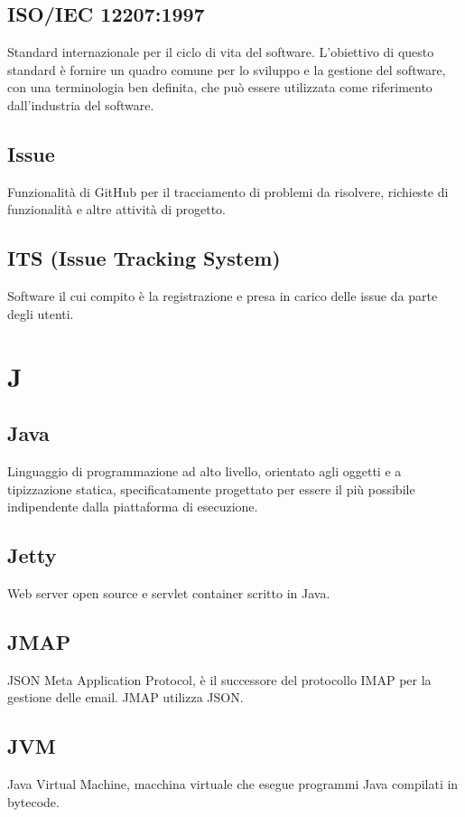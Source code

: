 \documentclass[12pt]{article}
\begin{document}
		\subsection{ISO/IEC 12207:1997}
		Standard internazionale per il ciclo di vita del software. L'obiettivo di questo standard è fornire un quadro comune per lo sviluppo e la gestione del software, con una terminologia ben definita, che può essere utilizzata come riferimento dall'industria del software.

		\subsection{Issue}
		Funzionalità di GitHub per il tracciamento di problemi da risolvere, richieste di funzionalità e altre attività di progetto.
		

		\subsection{ITS (Issue Tracking System)}
		Software il cui compito è la registrazione e presa in carico delle issue da parte degli utenti.
	\clearpage
	\section{J}
		\subsection{Java}
		Linguaggio di programmazione ad alto livello, orientato agli oggetti e a tipizzazione statica, specificatamente progettato per essere il più possibile indipendente dalla piattaforma di esecuzione.
		\subsection{Jetty}
		Web server open source e servlet container scritto in Java.

		\subsection{JMAP}
		JSON Meta Application Protocol, è il successore del protocollo IMAP per la gestione delle email. JMAP utilizza JSON.

		\subsection{JVM}
		Java Virtual Machine, macchina virtuale che esegue programmi Java compilati in bytecode.
	\clearpage
\end{document}
